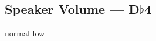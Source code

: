 \subsection{Speaker Volume --- \UiKey{\SET}D$\flat$4}









































normal
low
